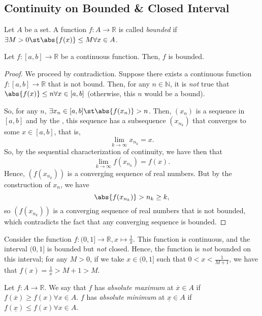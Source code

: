\documentclass[12pt]{article}
\begin{document}
\subsection{Continuity on Bounded \& Closed Interval}

\begin{definition}
  Let $A$ be a set. A function $f : A \to \mathbb{R}$ is called \emph{bounded} if $\exists M > 0 \st \abs{f(x)} \leq M \forall x \in A$.
\end{definition}

\begin{theorem}\label{thm:closeddomaincontinuous}
  Let $f : [a, b] \to \mathbb{R}$ be a continuous function. Then, $f$ is bounded.
\end{theorem}

\begin{proof}
We proceed by contradiction. Suppose there exists a continuous function $f : [a, b] \to \mathbb{R}$ that is not bound. Then, for any $n \in \mathbb{N}$, it is \emph{not} true that $\abs{f(x)} \leq n \forall x \in [a, b]$ (otherwise, this $n$ would be a bound).

So, for any $n$, $\exists x_n \in [a, b] \st \abs{f(x_n)} > n$. Then, $(x_n)$ is a sequence in $[a,b]$ and by the , this sequence has a subsequence $(x_{n_k})$ that converges to some $x \in [a,b]$, that is, \[\lim_{k\to\infty} x_{n_k} = x.\] So, by the sequential characterization of continuity, we have then that $$\lim_{k \to \infty} f(x_{n_k}) = f(x).$$ Hence, $(f(x_{n_k}))$ is a converging sequence of real numbers. But by the construction of $x_n$, we have \[\abs{f(x_{n_k})} > n_k \geq k,\] so $(f(x_{n_k}))$ is a converging sequence of real numbers that is not bounded, which contradicts the fact that any converging sequence is bounded.
\end{proof}

\begin{example}
  Consider the function $f: (0, 1] \to \mathbb{R}, x \mapsto \frac{1}{x}$. This function is continuous, and the interval $(0, 1]$ is bounded but \emph{not} closed. Hence, the function is \emph{not} bounded on this interval; for any $M > 0$, if we take $x \in (0, 1]$ such that $0 < x < \frac{1}{M+1}$, we have that $f(x) = \frac{1}{x} > M + 1 > M$.
\end{example}

\begin{definition}
  Let $f : A \to \mathbb{R}$. We say that $f$ has \emph{absolute maximum} at $\overline{x} \in A$ if $f(\overline{x}) \geq f(x) \forall x \in A$. $f$ has \emph{absolute minimum} at $\underline{x} \in A$ if $f(\underline{x}) \leq f(x) \forall x \in A$.
\end{definition}
\end{document}

